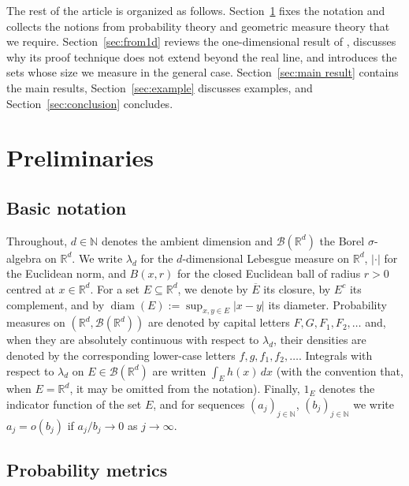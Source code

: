 \documentclass[12pt]{article}
\newcommand{\RR}{\mathbb{R}}
\newcommand{\NN}{\mathbb{N}}
\DeclareMathOperator{\diam}{diam}
\begin{document}
The rest of the article is organized as follows. Section~\ref{sec:notation} fixes the notation and collects the notions from probability theory and geometric measure theory that we require. Section~\ref{sec:from1d} reviews the one-dimensional result of \cite{bariletto2025identifiability}, discusses why its proof technique does not extend beyond the real line, and introduces the sets whose size we measure in the general case. Section~\ref{sec:main result} contains the main results, Section~\ref{sec:example} discusses examples, and Section~\ref{sec:conclusion} concludes.


\section{Preliminaries}\label{sec:notation}

\subsection{Basic notation}

Throughout, $d \in \NN$ denotes the ambient dimension and $\mathcal{B}(\RR^d)$ the Borel
$\sigma$-algebra on $\RR^d$. We write $\lambda_d$ for the $d$-dimensional Lebesgue measure on
$\RR^d$, $|\cdot|$ for the Euclidean norm, and $B(x,r)$ for the closed Euclidean ball of radius
$r>0$ centred at $x\in\mathbb R^d$. For a set $E \subseteq \RR^d$, we denote by $\overline{E}$ its closure, by
$E^c$ its complement, and by $\diam(E) := \sup_{x,y \in E}|x-y|$ its diameter. Probability
measures on $(\RR^d, \mathcal{B}(\RR^d))$ are denoted by capital letters $F, G, F_1, F_2, \dots$
and, when they are absolutely continuous with respect to $\lambda_d$, their densities are denoted
by the corresponding lower-case letters $f, g, f_1, f_2, \dots$. Integrals with respect to
$\lambda_d$ on $E\in\mathcal B(\mathbb R^d)$ are written $\int_E h(x)\,dx$ (with the convention that, when $E=\mathbb R^d$, it may be omitted from the notation). Finally, $1_E$ denotes the indicator function of the set $E$, and
for sequences $(a_j)_{j \in \NN}$, $(b_j)_{j \in \NN}$ we write $a_j = o(b_j)$ if
$a_j/b_j \to 0$ as $j \to \infty$.


\subsection{Probability metrics}
\end{document}
